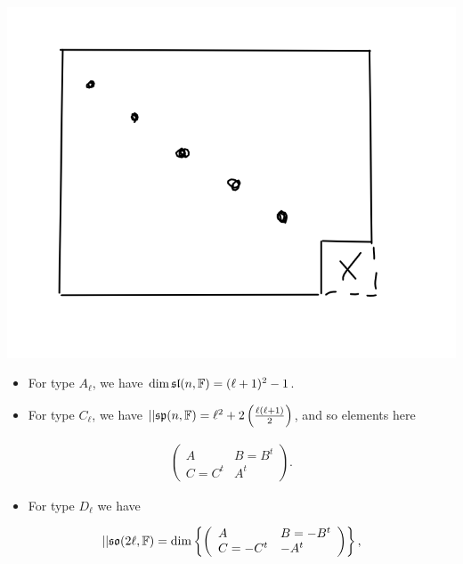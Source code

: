 \includegraphics{figures/2019-08-17-01:40.png}\\

\begin{itemize}
\item
  For type \(A_{\ell}\), we have
  \(\dim {\mathfrak{sl}}(n, {\mathbb{F}}) = (\ell+1)^{2} - 1\).
\item
  For type \(C_{\ell}\), we have
  \({\left\lvert {} \right\rvert}{{\mathfrak{sp}}(n, {\mathbb{F}})} = \ell^{2} + 2\left(\frac{\ell(\ell+1)}{2} \right )\),
  and so elements here
\end{itemize}

\begin{align*}
\left(\begin{array}{ll}
{A} & {B=B^{t}} \\ 
{C = C^{t}} & {A^{t}}
\end{array}\right)
.\end{align*}


\begin{itemize}
\tightlist
\item
  For type \(D_{\ell}\) we have
\end{itemize}

\begin{align*}
{\left\lvert {} \right\rvert}{{\mathfrak{so}}(2\ell, {\mathbb{F}})}
= \dim\left\{{ 
\left(\begin{array}{ll}{A}
 & {B=-B^{t}} \\ 
{C = -C^{t}} & {-A^{t}}
\end{array}\right)}\right\}
,\end{align*}

